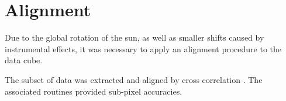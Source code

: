 \section{Alignment}

Due to the global rotation of the sun, as well as smaller shifts caused
by instrumental effects, it was necessary to apply an alignment procedure
to the data cube.

The subset of data was extracted and aligned by cross correlation
\citep{McAteer2003, McAteer2004}.
The associated routines provided sub-pixel accuracies.
